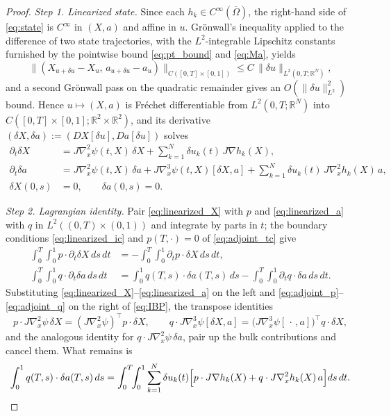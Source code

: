 \documentclass[10pt,a4paper]{amsart}
\begin{document}
\begin{proof}
\textit{Step 1. Linearized state.}
Since each $h_k\in C^\infty(\overline\Omega)$, the right-hand side of \eqref{eq:state} is $C^\infty$ in $(X,a)$ and affine in $u$. Gr\"onwall's inequality applied to the difference of two state trajectories, with the $L^2$-integrable Lipschitz constants furnished by the pointwise bound \eqref{eq:pt_bound} and \eqref{eq:Ma}, yields
\[
\|(X_{u+\delta u}-X_u,\,a_{u+\delta u}-a_u)\|_{C([0,T]\times[0,1])}\le C\,\|\delta u\|_{L^2(0,T;\mathbb R^N)},
\]
and a second Gr\"onwall pass on the quadratic remainder gives an $O(\|\delta u\|_{L^2}^2)$ bound. Hence $u\mapsto(X,a)$ is Fr\'echet differentiable from $L^2(0,T;\mathbb R^N)$ into $C([0,T]\times[0,1];\mathbb R^2\times\mathbb R^2)$, and its derivative $(\delta X,\delta a):=(DX[\delta u],Da[\delta u])$ solves
\begin{subequations}
\begin{align}
\partial_t\delta X &= J\nabla_x^2\psi(t,X)\,\delta X+\sum_{k=1}^N\delta u_k(t)\,J\nabla h_k(X),\label{eq:linearized_X}\\
\partial_t\delta a &= J\nabla_x^2\psi(t,X)\,\delta a+J\nabla_x^3\psi(t,X)[\delta X,a]+\sum_{k=1}^N\delta u_k(t)\,J\nabla_x^2 h_k(X)\,a,\label{eq:linearized_a}\\
\delta X(0,s)&=0,\qquad \delta a(0,s)=0.\label{eq:linearized_ic}
\end{align}
\end{subequations}

\vskip 5pt
\noindent\textit{Step 2. Lagrangian identity.}
Pair \eqref{eq:linearized_X} with $p$ and \eqref{eq:linearized_a} with $q$ in $L^2((0,T)\times(0,1))$ and integrate by parts in $t$; the boundary conditions \eqref{eq:linearized_ic} and $p(T,\cdot)=0$ of \eqref{eq:adjoint_tc} give
\begin{equation}\label{eq:IBP}
\begin{aligned}
\int_0^T\!\!\int_0^1 p\cdot\partial_t\delta X\,ds\,dt &= -\int_0^T\!\!\int_0^1 \partial_t p\cdot\delta X\,ds\,dt,\\
\int_0^T\!\!\int_0^1 q\cdot\partial_t\delta a\,ds\,dt &= \int_0^1 q(T,s)\cdot\delta a(T,s)\,ds-\int_0^T\!\!\int_0^1 \partial_t q\cdot\delta a\,ds\,dt.
\end{aligned}
\end{equation}
Substituting \eqref{eq:linearized_X}--\eqref{eq:linearized_a} on the left and \eqref{eq:adjoint_p}--\eqref{eq:adjoint_q} on the right of \eqref{eq:IBP}, the transpose identities
\[
p\cdot J\nabla_x^2\psi\,\delta X=(J\nabla_x^2\psi)^\top p\cdot\delta X,
\qquad
q\cdot J\nabla_x^3\psi[\delta X,a]=\bigl(J\nabla_x^3\psi[\,\cdot\,,a]\bigr)^\top q\cdot\delta X,
\]
and the analogous identity for $q\cdot J\nabla_x^2\psi\,\delta a$, pair up the bulk contributions and cancel them. What remains is
\begin{align}\label{eq:Lagrangian_id}
\int_0^1 q(T,s)\cdot\delta a(T,s)\,ds
=\int_0^T\!\!\int_0^1\sum_{k=1}^N\delta u_k(t)\Bigl[p\cdot J\nabla h_k(X)+q\cdot J\nabla_x^2 h_k(X)\,a\Bigr]ds\,dt.
\end{align}


\end{proof}
\end{document}
